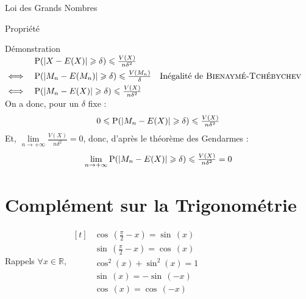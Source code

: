 \documentclass{coursbook}
\begin{document}
\begin{Gpartie}{Loi des Grands Nombres}
\begin{Spartie}{Propriété}
\begin{SSpartie}{Démonstration}
                $\begin{aligned}[t]
                    &\quad \Pde(\rvert X-E(X)\rvert\geq\delta)\leq\frac{V(X)}{n\delta^2} \\
                    \iff&\quad\Pde(\lvert M_n-E(M_n)\rvert\geq\delta)\leq\frac{V(M_n)}{\delta}\quad\text{Inégalité de \textsc{Bienaymé-Tchébychev}} \\
                    \iff&\quad\Pde(\lvert M_n-E(X)\rvert\geq\delta)\leq\frac{V(X)}{n\delta^2}
                \end{aligned}$ \\
                On a donc, pour un $\delta$ fixe : \[0\leq\Pde(\lvert M_n-E(X)\rvert\geq\delta)\leq\frac{V(X)}{n\delta^2}\]
                Et, $\lim\limits_{n\to +\infty}\frac{V(X)}{n\delta^2}=0$, donc, d'après le théorème des Gendarmes : \[\lim\limits_{n\to +\infty}\Pde(\lvert M_n-E(X)\rvert\geq\delta)\leq\frac{V(X)}{n\delta^2}=0\]
            \end{SSpartie}
        \end{Spartie}
    \end{Gpartie}


    \let\oldfrac\frac
    \let\frac\tfrac %

    \chapter{Complément sur la Trigonométrie}

    \begin{Gpartie}{Rappels}
        $\forall x\in\mathbb{R},~
        \begin{aligned}[t]&\cos\,\left(\frac{\pi}{2}-x\right)=\sin\,(x) \\
            &\sin\,\left(\frac{\pi}{2}-x\right)=\cos\,(x) \\
            &\cos^2(x)+\sin^2(x)=1 \\
            &\sin\,(x)=-\sin\,(-x) \\
            &\cos\,(x)=\cos\,(-x)
        \end{aligned}$
    \end{Gpartie}
\end{document}
